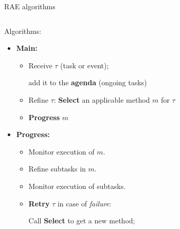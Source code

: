 \begin{frame}{RAE algorithms}
    \begin{columns}[T]
  
        \begin{column}{0.65\textwidth}
            
            Algorithms:
            \small
            \begin{itemize}
                \setlength{\leftmargini}{-1pt}
                \item \textbf{Main:} 
                \begin{itemize}
                    \item Receive $\tau$ (task or event);
                    
                    add it to the \textbf{agenda} (ongoing tasks)
                    \item Refine $\tau$: \textbf{Select} an applicable method $m$ for $\tau$
                    \item \textbf{Progress} $m$
                \end{itemize}
                \item \textbf{Progress:}
                    \begin{itemize}
                        \item Monitor execution of $m$.
                        \item Refine subtasks in $m$.    
                        \item Monitor execution of subtasks.
                        \item \textbf{Retry} $\tau$ in case of \emph{failure}:
                    
                    Call \textbf{Select} to get a new method;
                    

\end{itemize}
\end{itemize}
\end{column}
\end{columns}
\end{frame}
